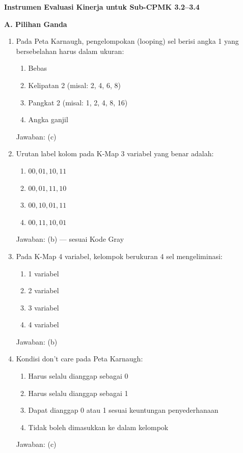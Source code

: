 \documentclass[../main]{subfiles}
\begin{document}

\begin{asesmen}
\textbf{Instrumen Evaluasi Kinerja untuk Sub-CPMK 3.2--3.4}

\textbf{A. Pilihan Ganda}
\begin{enumerate}
  \item Pada Peta Karnaugh, pengelompokan (looping) sel berisi angka 1 yang bersebelahan harus dalam ukuran:
  \begin{enumerate}
    \item Bebas
    \item Kelipatan 2 (misal: 2, 4, 6, 8)
    \item Pangkat 2 (misal: 1, 2, 4, 8, 16)
    \item Angka ganjil
  \end{enumerate}
  Jawaban: (c)

  \item Urutan label kolom pada K-Map 3 variabel yang benar adalah:
  \begin{enumerate}
    \item $00, 01, 10, 11$
    \item $00, 01, 11, 10$
    \item $00, 10, 01, 11$
    \item $00, 11, 10, 01$
  \end{enumerate}
  Jawaban: (b) --- sesuai Kode Gray

  \item Pada K-Map 4 variabel, kelompok berukuran 4 sel mengeliminasi:
  \begin{enumerate}
    \item 1 variabel
    \item 2 variabel
    \item 3 variabel
    \item 4 variabel
  \end{enumerate}
  Jawaban: (b)

  \item Kondisi don't care pada Peta Karnaugh:
  \begin{enumerate}
    \item Harus selalu dianggap sebagai 0
    \item Harus selalu dianggap sebagai 1
    \item Dapat dianggap 0 atau 1 sesuai keuntungan penyederhanaan
    \item Tidak boleh dimasukkan ke dalam kelompok
  \end{enumerate}
  Jawaban: (c)


\end{enumerate}
\end{asesmen}
\end{document}

